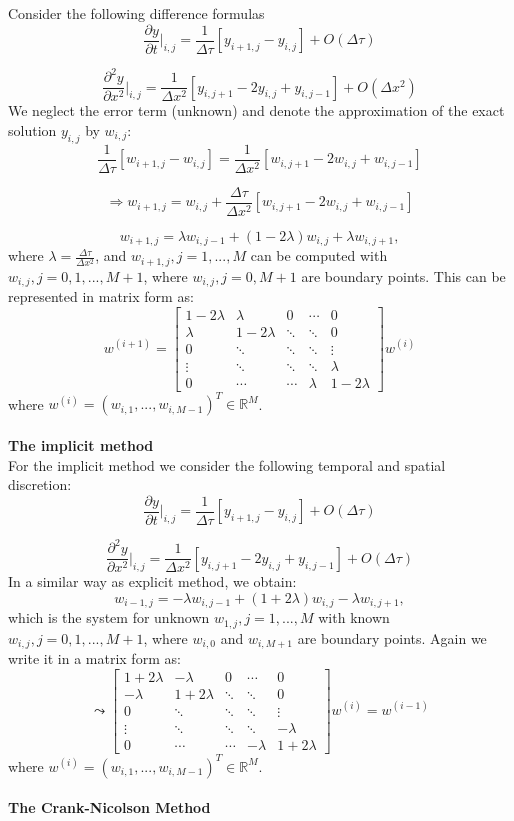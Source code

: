 \documentclass{article}
\begin{document}
Consider the following difference formulas
$$
\frac{\partial y}{\partial t}|_{i,j} = \frac{1}{\Delta \tau}[y_{i+1,j}-y_{i,j}]+O(\Delta \tau)
$$

$$
\frac{\partial^2 y}{\partial x^2}|_{i,j} = \frac{1}{\Delta x^2}[y_{i,j+1}-2y_{i,j}+y_{i,j-1}]+O(\Delta x^2)
$$
We neglect the error term (unknown) and denote the approximation of the exact solution $y_{i,j}$ by $w_{i,j}$:
$$
\frac{1}{\Delta \tau}[w_{i+1,j}-w_{i,j}] = \frac{1}{\Delta x^2}[w_{i,j+1}-2w_{i,j}+w_{i,j-1}]
$$

$$
\Rightarrow w_{i+1,j} = w_{i,j} + \frac{\Delta \tau}{\Delta x^2}[w_{i,j+1}-2w_{i,j}+w_{i,j-1}]
$$

$$w_{i+1,j} = \lambda w_{i,j-1}+(1 - 2\lambda)w_{i,j}+\lambda w_{i,j+1},$$
where $\lambda = \frac{\Delta \tau}{\Delta x^2}$, and $w_{i+1,j}, j = 1, ... ,M$ can be computed with $w_{i,j}, j = 0,1, ... , M+1$, where $w_{i,j}, j = 0,M+1$ are boundary points. This can be represented in matrix form as:
$$
w^{(i+1)}=\begin{bmatrix}
1-2\lambda  & \lambda  & 0  & \cdots & 0 \\ 
\lambda &1-2\lambda  & \ddots  &\ddots   & 0\\ 
 0& \ddots  & \ddots  & \ddots  & \vdots \\ 
 \vdots & \ddots  & \ddots  &\ddots   & \lambda\\ 
 0& \cdots  &\cdots   &\lambda  & 1-2\lambda
\end{bmatrix}w^{(i)}
$$
where $w^{(i)} = (w_{i,1}, ..., w_{i,M-1})^T \in \mathbb{R}^M$.\\\\
\textbf{The implicit method}\\

For the implicit method we consider the following temporal and spatial discretion: 
$$
\frac{\partial y}{\partial t}|_{i,j} = \frac{1}{\Delta \tau}[y_{i+1,j}-y_{i,j}]+O(\Delta \tau)
$$

$$
\frac{\partial^2 y}{\partial x^2}|_{i,j} = \frac{1}{\Delta x^2}[y_{i,j+1}-2y_{i,j}+y_{i,j-1}]+O(\Delta \tau)
$$
In a similar way as explicit method, we obtain:
$$
w_{i-1,j} = -\lambda w_{i,j-1} + (1+2\lambda)w_{i,j} - \lambda w_{i,j+1},
$$
which is the system for unknown $w_{1,j}, j = 1, ... ,M$ with known $w_{i,j}, j = 0,1, ... , M+1$, where $w_{i,0}$ and $w_{i,M+1}$ are boundary points. Again we write it in a matrix form as:
$$
\leadsto \begin{bmatrix}
1+2\lambda  & -\lambda  & 0  & \cdots & 0 \\ 
-\lambda &1+2\lambda  & \ddots  &\ddots   & 0\\ 
 0& \ddots  & \ddots  & \ddots  & \vdots \\ 
 \vdots & \ddots  & \ddots  &\ddots   & -\lambda\\ 
 0& \cdots  &\cdots   &-\lambda  & 1+2\lambda
\end{bmatrix}w^{(i)} = w^{(i-1)}$$
where $ w^{(i)} = (w_{i,1}, ... , w_{i, M-1})^T \in \mathbb{R}^M $.\\\\
\textbf{The Crank-Nicolson Method}\\
\end{document}

